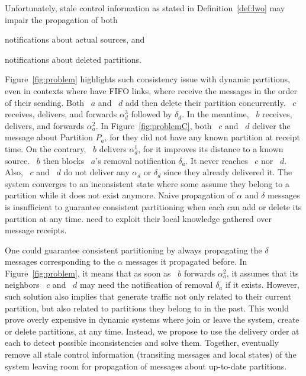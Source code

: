 Unfortunately, stale control information as stated in
Definition~\ref{def:lwo} may impair the propagation of both
\begin{inparaenum}[(i)]
\item notifications about actual sources, and
\item notifications about deleted partitions.
\end{inparaenum}
Figure~\ref{fig:problem} highlights such consistency issue with
dynamic partitions, even in contexts where \processes have FIFO links,
\ie where \processes receive the messages in the order of their
sending. Both \Process~$a$ and \Process~$d$ add then delete their
partition concurrently. \Process~$c$ receives, delivers, and forwards
$\alpha_d^3$ followed by $\delta_d$. In the meantime, \Process~$b$
receives, delivers, and forwards $\alpha_a^2$. In
Figure~\ref{fig:problemC}, both \Process~$c$ and \Process~$d$ deliver
the message about Partition $P_a$, for they did not have any known
partition at receipt time. On the contrary, \Process~$b$ delivers
$\alpha_d^1$, for it improves its distance to a known
source. \Process~$b$ then blocks \Process~$a$'s removal notification
$\delta_a$. It never reaches \Process~$c$ nor \Process~$d$. Also,
\Process~$c$ and \Process~$d$ do not deliver any $\alpha_d$ or
$\delta_d$ since they already delivered it. The system converges to an
inconsistent state where some \processes assume they belong to a
partition while it does not exist anymore. Naive propagation of
$\alpha$ and $\delta$ messages is insufficient to guarantee consistent
partitioning when each \process can add or delete its partition at any
time. \Processes need to exploit their local knowledge gathered over
message receipts.



One could guarantee consistent partitioning by always propagating the
$\delta$ messages corresponding to the $\alpha$ messages it propagated
before. In Figure~\ref{fig:problem}, it means that as soon as
\Process~$b$ forwards $\alpha_a^2$, it assumes that its neighbors
\Process~$c$ and \Process~$d$ may need the notification of removal
$\delta_a$ if it exists. However, such solution also implies that
\processes generate traffic not only related to their current
partition, but also related to partitions they belong to in the
past. This would prove overly expensive in dynamic systems where
\processes join or leave the system, create or delete partitions, at
any time. Instead, we propose to use the delivery order at each
\process to detect possible inconsistencies and solve them. Together,
\processes eventually remove all stale control information (transiting
messages and local states) of the system leaving room for propagation
of messages about up-to-date partitions.


